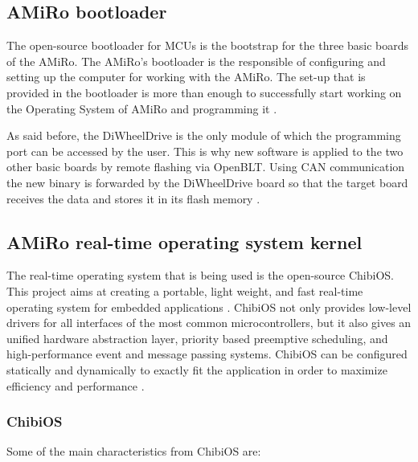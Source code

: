 \documentclass[12pt]{report}%
\begin{document}
\subsection{AMiRo bootloader}
\label{sub:btl}
The open-source bootloader for MCUs is the bootstrap for the three basic boards of the AMiRo. The AMiRo's bootloader is the responsible of configuring and setting up the computer for working with the AMiRo. The set-up that is provided in the bootloader is more than enough to successfully start working on the Operating System of AMiRo and programming it \cite{btl}.

As said before, the DiWheelDrive is the only module of which the programming port can be accessed by the user. This is why new software is applied to the two other basic boards by remote flashing via OpenBLT. Using CAN communication the new binary is forwarded by the DiWheelDrive board so that the target board receives the data and stores it in its flash memory \cite{AMiRo_paper_modular}.

\subsection{AMiRo real-time operating system kernel}
The real-time operating system that is being used is the open-source ChibiOS. This project aims at creating a portable, light weight, and fast real-time operating system for embedded applications \cite{chibioshp}. ChibiOS not only provides low-level drivers for all interfaces of the most common microcontrollers, but it also gives an unified hardware abstraction layer, priority based preemptive scheduling, and high-performance event and message passing systems. ChibiOS can be configured statically and dynamically to exactly fit the application in order to maximize efficiency and performance \cite{AMiRo_paper_modular}.

\subsubsection{ChibiOS}
Some of the main characteristics from ChibiOS are:
\end{document}
